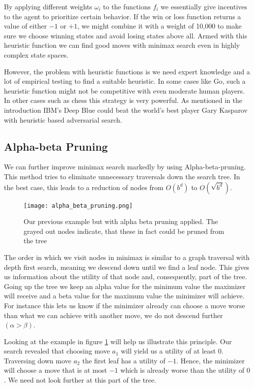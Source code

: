 By applying different weights $ \omega_i $ to the functions $ f_i $ we essentially give incentives to the agent to prioritize certain behavior. If the win or loss function returns a value of either $-1$ or $+1$, we might combine it with a weight of 10,000 to make sure we choose winning states and avoid losing states above all. Armed with this heuristic function we can find good moves with minimax search even in highly complex state spaces.

However, the problem with heuristic functions is we need expert knowledge and a lot of empirical testing to find a suitable heuristic. In some cases like Go, such a heuristic function might not be competitive with even moderate human players. In other cases such as chess this strategy is very powerful. As mentioned in the introduction IBM's Deep Blue could beat the world's best player Gary Kasparov with heuristic based adversarial search.

\subsection{Alpha-beta Pruning}
We can further improve minimax search markedly by using Alpha-beta-pruning. This method tries to eliminate unnecessary traversals down the search tree. In the best case, this leads to a reduction of nodes from $ O(b^d) $ to $ O(\sqrt{b^d}) $.

\begin{figure}
    \centering
    \texttt{[image: alpha\_beta\_pruning.png]}
    \caption{Our previous example but with alpha beta pruning applied. The grayed out nodes indicate, that these in fact could be pruned from the tree}
    \label{alpha_beta_pruning}
\end{figure}

The order in which we visit nodes in minimax is similar to a graph traversal with depth first search, meaning we descend down until we find a leaf node. This gives us information about the utility of that node and, consequently, part of the tree. Going up the tree we keep an alpha value for the minimum value the maximizer will receive and a beta value for the maximum value the minimizer will achieve. For instance this lets us know if the minimizer already can choose a move worse than what we can achieve with another move, we do not descend further $ (\alpha > \beta) $.

Looking at the example in figure \ref{alpha_beta_pruning} will help us illustrate this principle. Our search revealed that choosing move $ a_1 $ will yield us a utility of at least $0$. Traversing down move $ a_2 $ the first leaf has a utility of $-1$. Hence, the minimizer will choose a move that is at most $-1$ which is already worse than the utility of $0$. We need not look further at this part of the tree.

